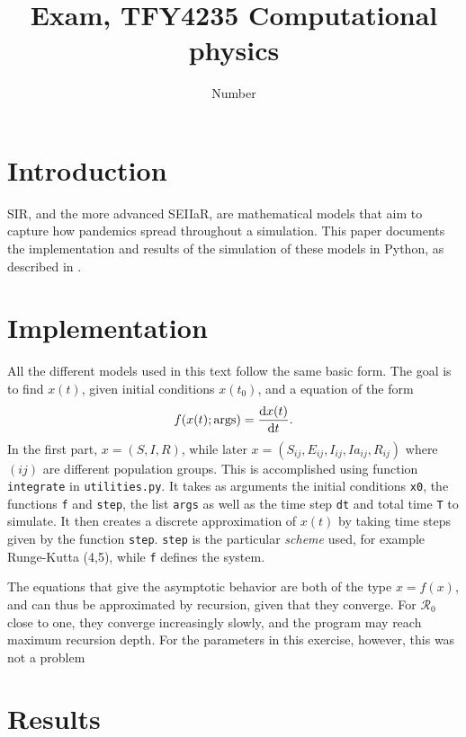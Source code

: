 \documentclass{article}
\title{Exam, TFY4235 Computational physics}
\author{Number}
\date{}
\begin{document}
    \maketitle
    \section*{Introduction}
    SIR, and the more advanced SEIIaR, are mathematical models that aim to capture how pandemics spread throughout a simulation.
    This paper documents the implementation and results of the simulation of these models in Python, as described in \cite{exam}.

    \section*{Implementation}
    All the different models used in this text follow the same basic form. 
    The goal is to find $x(t)$, given initial conditions $x(t_0)$, and a equation of the form
    \begin{equation*}
        f(x(t); \mathrm{args}) = \dv{x(t)}{t}.
    \end{equation*}
    In the first part, $x = (S, I, R)$, while later $x = (S_{ij}, E_{ij}, I_{ij}, Ia_{ij}, R_{ij})$ where $(ij)$ are different population groups. 
    This is accomplished using function \verb|integrate| in \verb|utilities.py|. 
    It takes as arguments the initial conditions \verb|x0|, the functions \verb|f| and \verb|step|, the list \verb|args| as well as the time step \verb|dt| and total time \verb|T| to simulate. 
    It then creates a discrete approximation of $x(t)$ by taking time steps given by the function \verb|step|. 
    \verb|step| is the particular \emph{scheme} used, for example Runge-Kutta (4,5), while \verb|f| defines the system. 


    The equations that give the asymptotic behavior are both of the type $x = f(x)$, and can thus be approximated by recursion, given that they converge. 
    For $\mathcal{R}_0$ close to one, they converge increasingly slowly, and the program may reach maximum recursion depth. 
    For the parameters in this exercise, however, this was not a problem

    \section*{Results}
\end{document}
